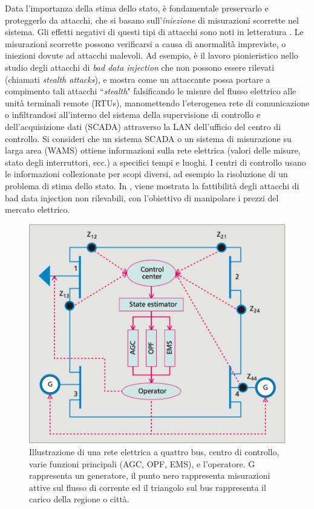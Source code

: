 Data l'importanza della stima dello stato, è fondamentale preservarlo e proteggerlo da attacchi, che si basano sull'\emph{iniezione} di misurazioni scorrette nel sistema. Gli effetti negativi di questi tipi di attacchi sono noti in letteratura \cite{baddatainj}.  Le misurazioni scorrette possono verificarsi a causa di anormalità impreviste, o iniezioni dovute ad attacchi malevoli. Ad esempio, \cite{falsedatainj} è il lavoro pionieristico nello studio degli attacchi di \emph{bad data injection} che non possono essere rilevati (chiamati \emph{stealth attacks}), e mostra come un attaccante possa portare a compimento tali attacchi ``\emph{stealth}" falsificando le misure del flusso elettrico alle unità terminali remote (RTUs), manomettendo l'eterogenea rete di comunicazione o infiltrandosi all'interno del sistema della supervisione di controllo e dell'acquisizione dati (SCADA) attraverso la LAN dell'ufficio del centro di controllo. Si consideri che un sistema SCADA o un sistema di misurazione su larga area (WAMS) ottiene informazioni sulla rete elettrica (valori delle misure, stato degli interruttori, ecc.) a specifici tempi e luoghi. I centri di controllo usano le informazioni collezionate per scopi diversi, ad esempio la risoluzione di un problema di stima dello stato. In \cite{baddatainj2}, viene mostrata la fattibilità degli  attacchi di bad data injection non rilevabili, con l'obiettivo di manipolare i prezzi del mercato elettrico.
\begin{figure}[h]
	\centering
	\includegraphics[scale=.3]{imgs/attack/fourbuspowernet.png}
	\caption{Illustrazione di una rete elettrica a quattro bus, centro di controllo, varie funzioni principali (AGC, OPF, EMS), e l'operatore. G rappresenta un generatore, il punto nero rappresenta misurazioni attive sul flusso di corrente ed il triangolo sul bus rappresenta il carico della regione o città.}
	\label{fourbuspowernet_img}
\end{figure}

